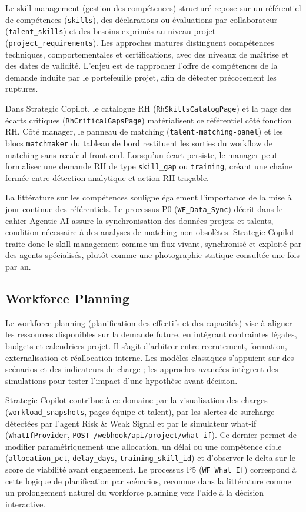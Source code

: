 Le skill management (gestion des compétences) structuré repose sur un référentiel de compétences (\texttt{skills}), des déclarations ou évaluations par collaborateur (\texttt{talent\_skills}) et des besoins exprimés au niveau projet (\texttt{project\_requirements}). Les approches matures distinguent compétences techniques, comportementales et certifications, avec des niveaux de maîtrise et des dates de validité. L'enjeu est de rapprocher l'offre de compétences de la demande induite par le portefeuille projet, afin de détecter précocement les ruptures.

Dans Strategic Copilot, le catalogue RH (\texttt{RhSkillsCatalogPage}) et la page des écarts critiques (\texttt{RhCriticalGapsPage}) matérialisent ce référentiel côté fonction RH. Côté manager, le panneau de matching (\texttt{talent-matching-panel}) et les blocs \texttt{matchmaker} du tableau de bord restituent les sorties du workflow de matching sans recalcul front-end. Lorsqu'un écart persiste, le manager peut formaliser une demande RH de type \texttt{skill\_gap} ou \texttt{training}, créant une chaîne fermée entre détection analytique et action RH traçable.

La littérature sur les compétences souligne également l'importance de la mise à jour continue des référentiels. Le processus P0 (\texttt{WF\_Data\_Sync}) décrit dans le cahier Agentic AI assure la synchronisation des données projets et talents, condition nécessaire à des analyses de matching non obsolètes. Strategic Copilot traite donc le skill management comme un flux vivant, synchronisé et exploité par des agents spécialisés, plutôt comme une photographie statique consultée une fois par an.

\subsection{Workforce Planning}

Le workforce planning (planification des effectifs et des capacités) vise à aligner les ressources disponibles sur la demande future, en intégrant contraintes légales, budgets et calendriers projet. Il s'agit d'arbitrer entre recrutement, formation, externalisation et réallocation interne. Les modèles classiques s'appuient sur des scénarios et des indicateurs de charge ; les approches avancées intègrent des simulations pour tester l'impact d'une hypothèse avant décision.

Strategic Copilot contribue à ce domaine par la visualisation des charges (\texttt{workload\_snapshots}, pages équipe et talent), par les alertes de surcharge détectées par l'agent Risk \& Weak Signal et par le simulateur what-if (\texttt{WhatIfProvider}, \texttt{POST /webhook/api/project/what-if}). Ce dernier permet de modifier paramétriquement une allocation, un délai ou une compétence cible (\texttt{allocation\_pct}, \texttt{delay\_days}, \texttt{training\_skill\_id}) et d'observer le delta sur le score de viabilité avant engagement. Le processus P5 (\texttt{WF\_What\_If}) correspond à cette logique de planification par scénarios, reconnue dans la littérature comme un prolongement naturel du workforce planning vers l'aide à la décision interactive.

